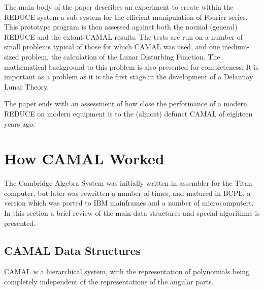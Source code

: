 The main body of the paper describes an experiment to create within
the REDUCE system a sub-system for the efficient manipulation of
Fourier series.  This prototype program is then assessed against both
the normal (general) REDUCE and the extant CAMAL results.  The tests
are run on a number of small problems typical of those for which CAMAL
was used, and one medium-sized problem, the calculation of the Lunar
Disturbing Function.  The mathematical background to this problem is
also presented for completeness.  It is important as a problem as it
is the first stage in the development of a Delaunay Lunar Theory.

The paper ends with an assessment of how close the performance of a
modern REDUCE on modern equipment is to the (almost) defunct CAMAL of
eighteen years ago.

\section{How CAMAL Worked}

The Cambridge Algebra System was initially written in assembler for
the Titan computer, but later was rewritten a number of times, and
matured in BCPL, a version which was ported to IBM mainframes and a
number of microcomputers.  In this section a brief review of the main
data structures and special algorithms is presented.

\subsection{CAMAL Data Structures}

CAMAL is a hierarchical system, with the representation of polynomials
being completely independent of the representations of the angular
parts.

